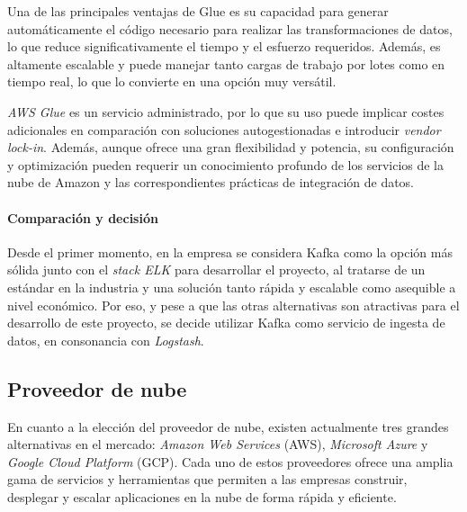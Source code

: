 Una de las principales ventajas de Glue es su capacidad para generar
automáticamente el código necesario para realizar las transformaciones de datos,
lo que reduce significativamente el tiempo y el esfuerzo requeridos. Además, es
altamente escalable y puede manejar tanto cargas de trabajo por lotes como en
tiempo real, lo que lo convierte en una opción muy versátil.

\textit{AWS Glue} es un servicio administrado, por lo que su uso puede implicar
costes adicionales en comparación con soluciones autogestionadas e introducir
\textit{vendor lock-in}. Además, aunque ofrece una gran flexibilidad y potencia,
su configuración y optimización pueden requerir un conocimiento profundo de los
servicios de la nube de Amazon y las correspondientes prácticas de integración
de datos.


\paragraph{Comparación y decisión}
Desde el primer momento, en la empresa se considera Kafka como la opción más
sólida junto con el \textit{stack ELK} para desarrollar el proyecto, al
tratarse de un estándar en la industria y una solución tanto rápida y escalable
como asequible a nivel económico. Por eso, y pese a que las otras alternativas
son atractivas para el desarrollo de este proyecto, se decide utilizar Kafka
como servicio de ingesta de datos, en consonancia con \textit{Logstash}.



\newpage{}
\subsection{Proveedor de nube}\label{subsec:alt_proveedor}
En cuanto a la elección del proveedor de nube, existen actualmente tres
grandes alternativas en el mercado: \textit{Amazon Web Services} (AWS),
\textit{Microsoft Azure} y \textit{Google Cloud Platform} (GCP). Cada uno de
estos proveedores ofrece una amplia gama de servicios y herramientas que
permiten a las empresas construir, desplegar y escalar aplicaciones en la nube
de forma rápida y eficiente.

